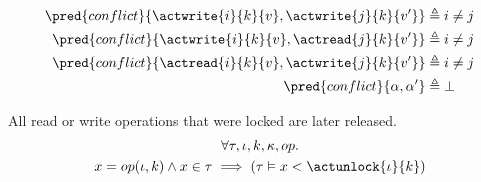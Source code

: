 \begin{align*}
\pred{conflict}{\actwrite{i}{k}{v}, \actwrite{j}{k}{v'}} &\triangleq i \neq j
\\
\pred{conflict}{\actwrite{i}{k}{v}, \actread{j}{k}{v'}} &\triangleq i \neq j
\\
\pred{conflict}{\actread{i}{k}{v}, \actwrite{j}{k}{v'}} &\triangleq i \neq j
\\
\pred{conflict}{\alpha, \alpha'} &\triangleq \bot 
\end{align*}

\lem \label{lem:unlock} All read or write operations that were locked are later released.
\begin{gather*}
\forall \tau, \iota, k, \kappa, op \ldotp \\
x = op(\iota, k) \land x \in \tau \implies \left( \tau \vDash x < \actunlock{\iota}{k} \right)
\end{gather*}

